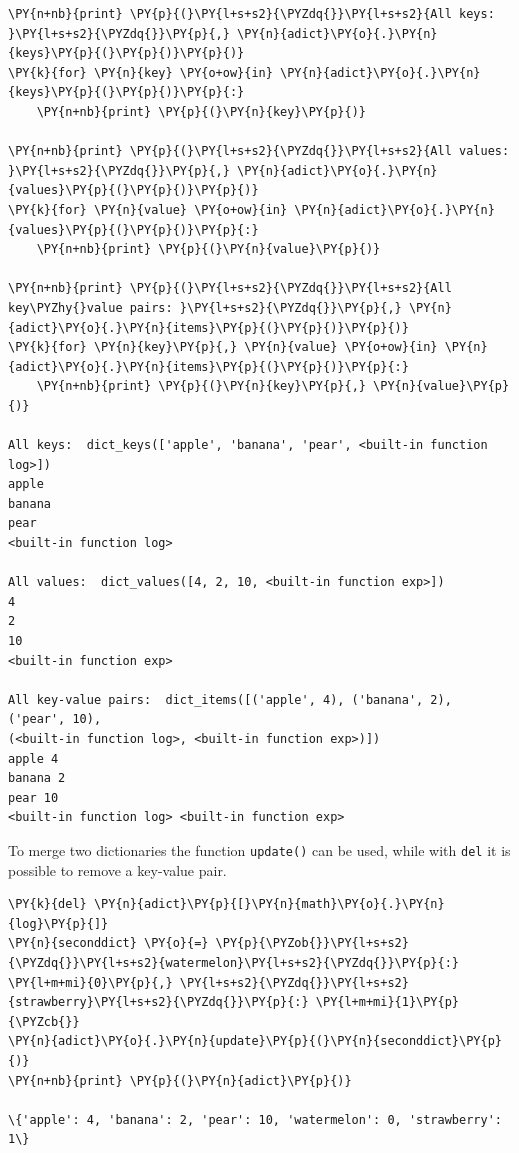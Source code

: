 \begin{tcolorbox}[breakable, size=fbox, boxrule=1pt, pad at break*=1mm, colback=cellbackground, colframe=cellborder]
\begin{Verbatim}[commandchars=\\\{\}]
\PY{n+nb}{print} \PY{p}{(}\PY{l+s+s2}{\PYZdq{}}\PY{l+s+s2}{All keys: }\PY{l+s+s2}{\PYZdq{}}\PY{p}{,} \PY{n}{adict}\PY{o}{.}\PY{n}{keys}\PY{p}{(}\PY{p}{)}\PY{p}{)}
\PY{k}{for} \PY{n}{key} \PY{o+ow}{in} \PY{n}{adict}\PY{o}{.}\PY{n}{keys}\PY{p}{(}\PY{p}{)}\PY{p}{:}
    \PY{n+nb}{print} \PY{p}{(}\PY{n}{key}\PY{p}{)}

\PY{n+nb}{print} \PY{p}{(}\PY{l+s+s2}{\PYZdq{}}\PY{l+s+s2}{All values: }\PY{l+s+s2}{\PYZdq{}}\PY{p}{,} \PY{n}{adict}\PY{o}{.}\PY{n}{values}\PY{p}{(}\PY{p}{)}\PY{p}{)}
\PY{k}{for} \PY{n}{value} \PY{o+ow}{in} \PY{n}{adict}\PY{o}{.}\PY{n}{values}\PY{p}{(}\PY{p}{)}\PY{p}{:}
    \PY{n+nb}{print} \PY{p}{(}\PY{n}{value}\PY{p}{)}

\PY{n+nb}{print} \PY{p}{(}\PY{l+s+s2}{\PYZdq{}}\PY{l+s+s2}{All key\PYZhy{}value pairs: }\PY{l+s+s2}{\PYZdq{}}\PY{p}{,} \PY{n}{adict}\PY{o}{.}\PY{n}{items}\PY{p}{(}\PY{p}{)}\PY{p}{)}
\PY{k}{for} \PY{n}{key}\PY{p}{,} \PY{n}{value} \PY{o+ow}{in} \PY{n}{adict}\PY{o}{.}\PY{n}{items}\PY{p}{(}\PY{p}{)}\PY{p}{:}
    \PY{n+nb}{print} \PY{p}{(}\PY{n}{key}\PY{p}{,} \PY{n}{value}\PY{p}{)}

All keys:  dict_keys(['apple', 'banana', 'pear', <built-in function log>])
apple
banana
pear
<built-in function log>

All values:  dict_values([4, 2, 10, <built-in function exp>])
4
2
10
<built-in function exp>

All key-value pairs:  dict_items([('apple', 4), ('banana', 2), ('pear', 10),
(<built-in function log>, <built-in function exp>)])
apple 4
banana 2
pear 10
<built-in function log> <built-in function exp>
\end{Verbatim}
\end{tcolorbox}

To merge two dictionaries the function \texttt{update()} can be used, while with 
\texttt{del} it is possible to remove a key-value pair.

\begin{tcolorbox}[breakable, size=fbox, boxrule=1pt, pad at break*=1mm, colback=cellbackground, colframe=cellborder]
\begin{Verbatim}[commandchars=\\\{\}]
\PY{k}{del} \PY{n}{adict}\PY{p}{[}\PY{n}{math}\PY{o}{.}\PY{n}{log}\PY{p}{]}
\PY{n}{seconddict} \PY{o}{=} \PY{p}{\PYZob{}}\PY{l+s+s2}{\PYZdq{}}\PY{l+s+s2}{watermelon}\PY{l+s+s2}{\PYZdq{}}\PY{p}{:} \PY{l+m+mi}{0}\PY{p}{,} \PY{l+s+s2}{\PYZdq{}}\PY{l+s+s2}{strawberry}\PY{l+s+s2}{\PYZdq{}}\PY{p}{:} \PY{l+m+mi}{1}\PY{p}{\PYZcb{}}
\PY{n}{adict}\PY{o}{.}\PY{n}{update}\PY{p}{(}\PY{n}{seconddict}\PY{p}{)}
\PY{n+nb}{print} \PY{p}{(}\PY{n}{adict}\PY{p}{)}

\{'apple': 4, 'banana': 2, 'pear': 10, 'watermelon': 0, 'strawberry': 1\}
\end{Verbatim}
\end{tcolorbox}

